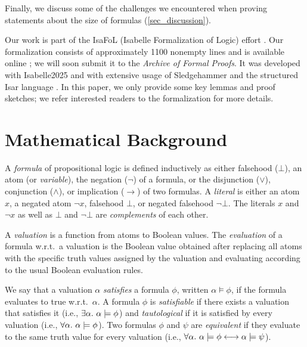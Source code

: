 \documentclass[a4paper,USenglish,cleveref, autoref, thm-restate]{lipics-v2021}
\theoremstyle{definition}
\begin{document}
Finally, we discuss some of the challenges we encountered when proving statements about the size of formulas (\cref{sec_discussion}).

Our work is part of the IsaFoL (Isabelle Formalization of Logic) effort \cite{Blanchette_CPP2019_IsaFoL}.
Our formalization consists of approximately 1100 nonempty lines
and is available online \cite{Formalization_GitHub};
we will soon submit it to the \emph{Archive of Formal Proofs}.
It was developed with Isabelle2025 \cite{Nipkow_Klein_2014,Nipkow_Paulson_Wenzel_2002} and with extensive usage of Sledgehammer \cite{Blanchette_Boehme_Paulson_JAR2013,Paulson_Blanchette_IWIL2010} and the structured Isar language \cite{Wenzel_2007}.
In this paper, we only provide some key lemmas and proof sketches;
we refer interested readers to the formalization for more details.

\section{Mathematical Background}
\label{sec_background}

A \emph{formula} of propositional logic is defined inductively as either falsehood ($\bot$), an atom (or \emph{variable}), the negation ($\neg$) of a formula, or the disjunction ($\lor$), conjunction ($\land$), or implication ($\rightarrow$) of two formulas.
A \emph{literal} is either an atom $x$, a negated atom $\neg x$, falsehood $\bot$, or negated falsehood $\neg\bot$.
The literals $x$ and $\neg x$ as well as $\bot$ and $\neg\bot$ are \emph{complements} of each other.

A \emph{valuation} is a function from atoms to Boolean values.
The \emph{evaluation} of a formula w.r.t.\ a valuation is the Boolean value obtained after replacing all atoms with the specific truth values assigned by the valuation and evaluating according to the usual Boolean evaluation rules.

We say that a valuation $\alpha$ \emph{satisfies} a formula $\phi$, written $\alpha \models \phi$, if the formula evaluates to true w.r.t.\ $\alpha$.
A formula $\phi$ is
\emph{satisfiable} if there exists a valuation that satisfies it (i.e., $\exists \alpha. ~ \alpha \models \phi$) and
\emph{tautological} if it is satisfied by every valuation (i.e., $\forall \alpha. ~ \alpha \models \phi$).
Two formulas $\phi$ and $\psi$ are \emph{equivalent} if they evaluate to the same truth value for every valuation (i.e., $\forall \alpha. ~ \alpha \models \phi \longleftrightarrow \alpha \models \psi$).
\end{document}
